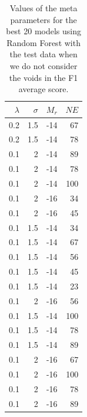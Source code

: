 \documentclass[usenatbib]{mnras}
\begin{document}
\begin{table}
\centering
\begin{tabular}{rrrr}
\hline
   $\lambda$ &   $\sigma$ &   $M_r$ &   $NE$ \\
\hline
         0.2 &        1.5 &     -14 &     67 \\
         0.2 &        1.5 &     -14 &     78 \\
         0.1 &        2   &     -14 &     89 \\
         0.1 &        2   &     -14 &     78 \\
         0.1 &        2   &     -14 &    100 \\
         0.1 &        2   &     -16 &     34 \\
         0.1 &        2   &     -16 &     45 \\
         0.1 &        1.5 &     -14 &     34 \\
         0.1 &        1.5 &     -14 &     67 \\
         0.1 &        1.5 &     -14 &     56 \\
         0.1 &        1.5 &     -14 &     45 \\
         0.1 &        1.5 &     -14 &     23 \\
         0.1 &        2   &     -16 &     56 \\
         0.1 &        1.5 &     -14 &    100 \\
         0.1 &        1.5 &     -14 &     78 \\
         0.1 &        1.5 &     -14 &     89 \\
         0.1 &        2   &     -16 &     67 \\
         0.1 &        2   &     -16 &    100 \\
         0.1 &        2   &     -16 &     78 \\
         0.1 &        2   &     -16 &     89 \\
\hline
\end{tabular}
\caption{Values of the meta parameters for the best 20 models using Random Forest with the test data when we do not consider the voids in the F1 average score.}
\label{tab:parameters}
\end{table}
\end{document}
